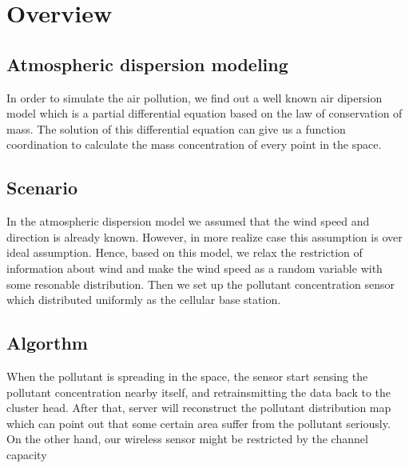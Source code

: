 \section{Overview}


\subsection{Atmospheric dispersion modeling}
In order to simulate the air pollution, we find out a well known air dipersion 
model which is a partial differential equation based on the law of 
conservation of mass. The solution of this differential equation can give us 
a function coordination to calculate the mass concentration of every point in 
the space.  


\subsection{Scenario}
In the atmospheric dispersion model we assumed that the wind speed and direction
is already known. However, in more realize case this assumption is over ideal 
assumption. Hence, based on this model, we relax the restriction of information 
about wind and make the wind speed as a random variable with some resonable 
distribution. Then we set up the  pollutant concentration sensor which distributed
uniformly as the cellular base station. 

\subsection{Algorthm}
When the pollutant is spreading in the space, the sensor start sensing the 
pollutant concentration nearby itself, and retrainsmitting the data back to the 
cluster head. After that, server will reconstruct the pollutant distribution map 
which can point out that some certain area suffer from the pollutant seriously.
On the other hand, our wireless sensor might be restricted by the channel capacity
 



